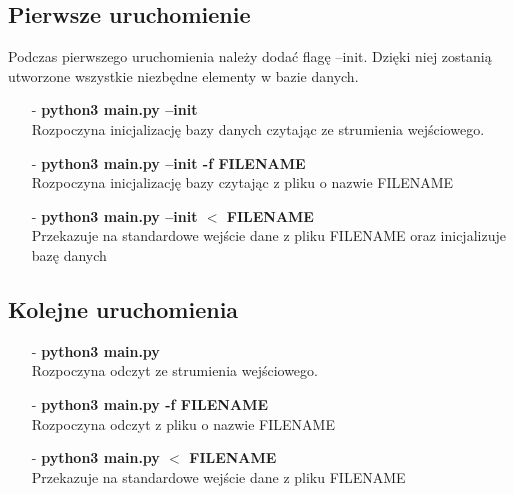 \documentclass[a4paper]{article}
\begin{document}
\subsection{Pierwsze uruchomienie}
Podczas pierwszego uruchomienia należy dodać flagę --init. Dzięki niej zostanią 
utworzone wszystkie niezbędne elementy w bazie danych.

\begin{itemize}
    \itemsep0em
    \item[-] \textbf{python3 main.py --init} \\ 
        Rozpoczyna inicjalizację bazy danych czytając ze strumienia wejściowego.
    \item[-] \textbf{python3 main.py --init -f FILENAME} \\  
        Rozpoczyna inicjalizację bazy czytając z pliku o nazwie FILENAME
    \item[-] \textbf{python3 main.py --init $<$ FILENAME} \\  
        Przekazuje na standardowe wejście dane z pliku FILENAME oraz inicjalizuje bazę danych
     
\end{itemize}

\subsection{Kolejne uruchomienia}
\begin{itemize}
    \itemsep0em
    \item[-] \textbf{python3 main.py} \\ 
        Rozpoczyna odczyt ze strumienia wejściowego.
    \item[-] \textbf{python3 main.py -f FILENAME} \\  
        Rozpoczyna odczyt z pliku o nazwie FILENAME
    \item [-] \textbf{python3 main.py $<$ FILENAME} \\
        Przekazuje na standardowe wejście dane z pliku FILENAME

\end{itemize}
\end{document}
